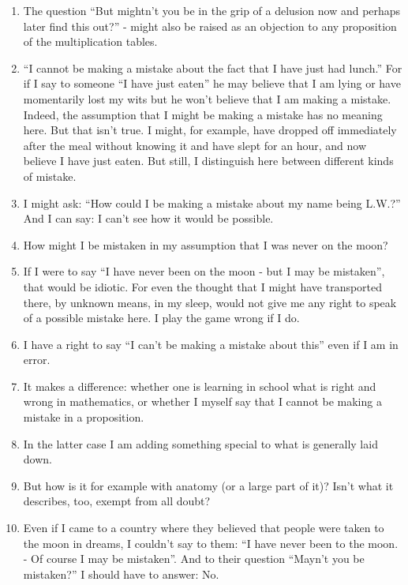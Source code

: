 \documentclass{book}
\begin{document}
\begin{enumerate}
\item
The question ``But mightn't you be in the grip of a delusion now and perhaps
later find this out?'' - might also be raised as an objection to any
proposition of the multiplication tables.

\item
``I cannot be making a mistake about the fact that I have just had lunch.'' For
if I say to someone ``I have just eaten'' he may believe that I am lying or
have momentarily lost my wits but he won't believe that I am making a mistake.
Indeed, the assumption that I might be making a mistake has no meaning here.
But that isn't true. I might, for example, have dropped off immediately after
the meal without knowing it and have slept for an hour, and now believe I have
just eaten.  But still, I distinguish here between different kinds of mistake.

\item
I might ask: ``How could I be making a mistake about my name being L.W.?'' And
I can say: I can't see how it would be possible.

\item
How might I be mistaken in my assumption that I was never on the moon?

\item
If I were to say ``I have never been on the moon - but I may be mistaken'',
that would be idiotic.  For even the thought that I might have transported
there, by unknown means, in my sleep, would not give me any right to speak of a
possible mistake here. I play the game wrong if I do.

\item
I have a right to say ``I can't be making a mistake about this'' even if I am
in error.

\item
It makes a difference: whether one is learning in school what is right and
wrong in mathematics, or whether I myself say that I cannot be making a mistake
in a proposition.

\item
In the latter case I am adding something special to what is generally laid
down.

\item
But how is it for example with anatomy (or a large part of it)? Isn't what it
describes, too, exempt from all doubt?

\item
Even if I came to a country where they believed that people were taken to the
moon in dreams, I couldn't say to them: ``I have never been to the moon. - Of
course I may be mistaken''. And to their question ``Mayn't you be mistaken?'' I
should have to answer: No.


\end{enumerate}
\end{document}
